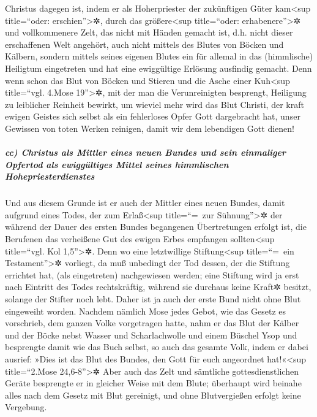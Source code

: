  Christus dagegen ist, indem er als Hoherpriester der
zukünftigen Güter kam\textless sup title=``oder:
erschien''\textgreater✲, durch das größere\textless sup title=``oder:
erhabenere''\textgreater✲ und vollkommenere Zelt, das nicht mit Händen
gemacht ist, d.h. nicht dieser erschaffenen Welt angehört,
 auch nicht mittels des Blutes von Böcken und Kälbern,
sondern mittels seines eigenen Blutes ein für allemal in das
(himmlische) Heiligtum eingetreten und hat eine ewiggültige Erlösung
ausfindig gemacht.  Denn wenn schon das Blut von Böcken
und Stieren und die Asche einer Kuh\textless sup title=``vgl. 4.Mose
19''\textgreater✲, mit der man die Verunreinigten besprengt, Heiligung
zu leiblicher Reinheit bewirkt,  um wieviel mehr wird das
Blut Christi, der kraft ewigen Geistes sich selbst als ein fehlerloses
Opfer Gott dargebracht hat, unser Gewissen von toten Werken reinigen,
damit wir dem lebendigen Gott dienen!

\hypertarget{cc-christus-als-mittler-eines-neuen-bundes-und-sein-einmaliger-opfertod-als-ewigguxfcltiges-mittel-seines-himmlischen-hohepriesterdienstes}{%
\subparagraph{cc) Christus als Mittler eines neuen Bundes und sein
einmaliger Opfertod als ewiggültiges Mittel seines himmlischen
Hohepriesterdienstes}\label{cc-christus-als-mittler-eines-neuen-bundes-und-sein-einmaliger-opfertod-als-ewigguxfcltiges-mittel-seines-himmlischen-hohepriesterdienstes}}

 Und aus diesem Grunde ist er auch der Mittler eines
neuen Bundes, damit aufgrund eines Todes, der zum Erlaß\textless sup
title=``=~zur Sühnung''\textgreater✲ der während der Dauer des ersten
Bundes begangenen Übertretungen erfolgt ist, die Berufenen das
verheißene Gut des ewigen Erbes empfangen sollten\textless sup
title=``vgl. Kol 1,5''\textgreater✲.  Denn wo eine
letztwillige Stiftung\textless sup title=``=~ein
Testament''\textgreater✲ vorliegt, da muß unbedingt der Tod dessen, der
die Stiftung errichtet hat, (als eingetreten) nachgewiesen werden;
 eine Stiftung wird ja erst nach Eintritt des Todes
rechtskräftig, während sie durchaus keine Kraft✲ besitzt, solange der
Stifter noch lebt.  Daher ist ja auch der erste Bund
nicht ohne Blut eingeweiht worden.  Nachdem nämlich Mose
jedes Gebot, wie das Gesetz es vorschrieb, dem ganzen Volke vorgetragen
hatte, nahm er das Blut der Kälber und der Böcke nebst Wasser und
Scharlachwolle und einem Büschel Ysop und besprengte damit wie das Buch
selbst, so auch das gesamte Volk,  indem er dabei
ausrief: »Dies ist das Blut des Bundes, den Gott für euch angeordnet
hat!«\textless sup title=``2.Mose 24,6-8''\textgreater✲ 
Aber auch das Zelt und sämtliche gottesdienstlichen Geräte besprengte er
in gleicher Weise mit dem Blute;  überhaupt wird beinahe
alles nach dem Gesetz mit Blut gereinigt, und ohne Blutvergießen erfolgt
keine Vergebung.

